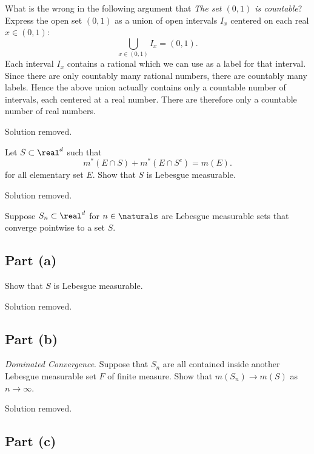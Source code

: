 \documentclass{article}
\begin{document}
\integratedtitle

\problemsec

What is the wrong in the following argument that \textit{The set $(0,1)$ is countable}?
Express the open set $(0,1)$ as a union of open intervals $I_x$ centered on each real $x\in (0,1)$:
\[
    \bigcup_{x\in (0,1)} I_x=(0,1).
\]
Each interval $I_x$ contains a rational which we can use as a label for that interval.
Since there are only countably many rational numbers, there are countably many labels.
Hence the above union actually contains only a countable number of intervals, each centered at a real number.
There are therefore only a countable number of real numbers.

\begin{solution}
    Solution removed.
\end{solution}

\problemsec 

Let $S\subset \real^d$ such that
\[
    m^*(E\cap S) + m^*(E\cap S^c) = m(E).
\]
for all elementary set $E$.
Show that $S$ is Lebesgue measurable.

\begin{solution}
    Solution removed.
\end{solution}

\problemsec

Suppose $S_n\subset \real^d$ for $n\in \naturals$ are Lebesgue measurable sets that converge pointwise to a set $S$.

\subsection{Part (a)}

Show that $S$ is Lebesgue measurable.

\begin{solution}
    Solution removed.
\end{solution}

\subsection{Part (b)}
\textit{Dominated Convergence}.
Suppose that $S_n$ are all contained inside another Lebesgue measurable set $F$ of finite measure.
Show that $m(S_n)\to m(S)$ as $n\to \infty$.

\begin{solution}
    Solution removed.
\end{solution}

\subsection{Part (c)}
\end{document}

